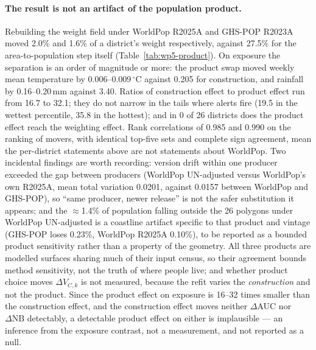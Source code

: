 \documentclass[11pt,a4paper]{article}
\begin{document}
\paragraph{The result is not an artifact of the population product.} Rebuilding the weight field under WorldPop R2025A and GHS-POP R2023A moved 2.0\% and 1.6\% of a district's weight respectively, against 27.5\% for the area-to-population step itself (Table~\ref{tab:wp5-product}). On exposure the separation is an order of magnitude or more: the product swap moved weekly mean temperature by 0.006--0.009\,$^{\circ}$C against 0.205 for construction, and rainfall by 0.16--0.20\,mm against 3.40. Ratios of construction effect to product effect run from 16.7 to 32.1; they do not narrow in the tails where alerts fire (19.5 in the wettest percentile, 35.8 in the hottest); and in 0 of 26 districts does the product effect reach the weighting effect. Rank correlations of 0.985 and 0.990 on the ranking of movers, with identical top-five sets and complete sign agreement, mean the per-district statements above are not statements about WorldPop. Two incidental findings are worth recording: version drift within one producer exceeded the gap between producers (WorldPop UN-adjusted versus WorldPop's own R2025A, mean total variation 0.0201, against 0.0157 between WorldPop and GHS-POP), so ``same producer, newer release'' is not the safer substitution it appears; and the $\approx$1.4\% of population falling outside the 26 polygons under WorldPop UN-adjusted is a coastline artifact specific to that product and vintage (GHS-POP loses 0.23\%, WorldPop R2025A 0.10\%), to be reported as a bounded product sensitivity rather than a property of the geometry. All three products are modelled surfaces sharing much of their input census, so their agreement bounds method sensitivity, not the truth of where people live; and whether product choice moves $\Delta V_{C,k}$ is not measured, because the refit varies the \emph{construction} and not the product. Since the product effect on exposure is 16--32 times smaller than the construction effect, and the construction effect moves neither $\Delta$AUC nor $\Delta\mathrm{NB}$ detectably, a detectable product effect on either is implausible --- an inference from the exposure contrast, not a measurement, and not reported as a null.
\end{document}
